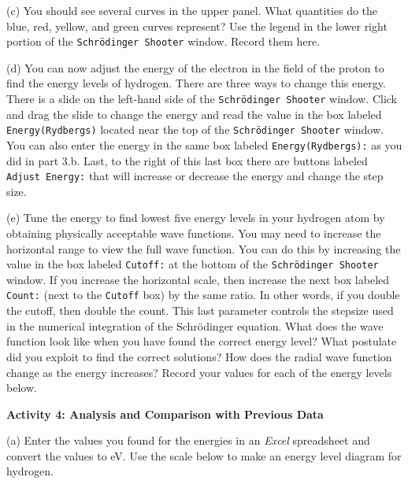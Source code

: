 (c) You should see several curves in the upper panel.
What quantities do the blue, red, yellow, and green curves represent?
Use the legend in the lower right portion of the {\tt Schr\"odinger Shooter}
window.
Record them here.
\answerspace{2.5cm}

(d) You can now adjust the energy of the electron in the field of the proton to find 
the energy levels of hydrogen.
There are three ways to change this energy.
There is a slide on the left-hand side of the {\tt Schr\"odinger Shooter} window.
Click and drag the slide to change the energy and read the value
in the box labeled {\tt Energy(Rydbergs)} located near the top of the 
{\tt Schr\"odinger Shooter} window.
You can also enter the energy in the same box
labeled {\tt Energy(Rydbergs):} as you did in part 3.b.
Last, to the right of this last box there are buttons labeled
{\tt Adjust Energy:} that will increase or decrease the energy and change the step size.

(e) Tune the energy to find lowest five energy levels in your hydrogen atom by obtaining
physically acceptable wave functions.
You may need to increase the horizontal range to view the full wave function.
You can do this by increasing the value in the box labeled {\tt Cutoff:} at the
bottom of the {\tt Schr\"odinger Shooter} window.
If you increase the horizontal scale, then increase the next box labeled
{\tt Count:} (next to the {\tt Cutoff} box) by the same ratio.
In other words, if you double the cutoff, then double the count.
This last parameter controls the stepsize used in the numerical integration of
the Schr\"odinger equation.
What does the wave function look like when you have found the correct energy level?
What postulate did you exploit to find the correct solutions?
How does the radial wave function change as the energy increases?
Record your values for each of the energy levels below.
\answerspace{5.0cm}

\textbf{Activity 4: Analysis and Comparison with Previous Data}

(a) Enter the values you found for the energies in an {\it Excel} spreadsheet
and convert the values to eV.
Use the scale below to make an energy level diagram for hydrogen.

\answerspace{0.25in}

